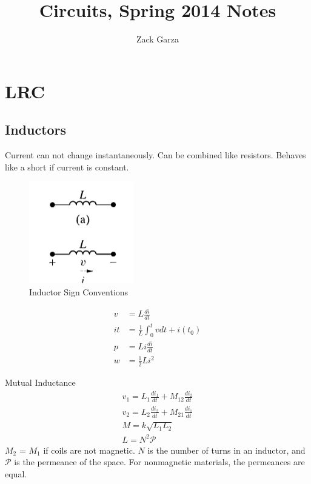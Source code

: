 \documentclass[a4paper,10pt]{report}
\begin{document}
\title{Circuits, Spring 2014 Notes}
\author{Zack Garza}
\maketitle
\tableofcontents

\chapter{LRC}
\section{Inductors}
Current can not change instantaneously.
Can be combined like resistors.
Behaves like a short if current is constant.

\begin{figure}[htpb]
	\begin{centering}
	\begin{center}
	\includegraphics{./inductor_sign_convention.png}
	\caption{Inductor Sign Conventions}
	\label{fig:inductor_sign_convention}
	\end{center}
	\par\end{centering}
\end{figure}

\begin{align*}
	v 		&= L \frac{di}{dt} \\
	i{t} 	&= \frac{1}{L} \int_0^t v dt + i(t_0) \\
	p 		&= Li\frac{di}{dt} \\
	w 		&= \frac{1}{2}Li^2
\end{align*}

Mutual Inductance
\begin{align*}
	v_1 = L_1\frac{di_1}{dt} + M_{12}\frac{di_2}{dt} \\
	v_2 = L_2\frac{di_2}{dt} + M_{21}\frac{di_1}{dt} \\
	M = k\sqrt{L_1L_2} \\
	L = N^2\mathcal{P}
\end{align*}
$M_2$ = $M_1$ if coils are not magnetic.
$N$ is the number of turns in an inductor, and $\mathcal{P}$ is the permeance of the space. For nonmagnetic materials, the permeances are equal.
\end{document}
